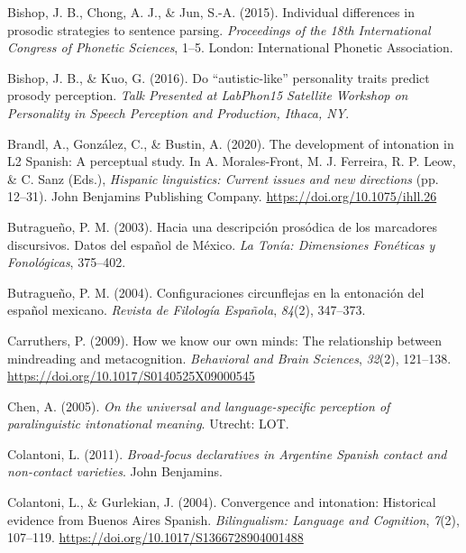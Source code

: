 \documentclass[]{article}
\newlength{\cslhangindent}
\newenvironment{CSLReferences}[2] %
 {%
  \setlength{\parindent}{0pt}
  \ifodd #1 \everypar{\setlength{\hangindent}{\cslhangindent}}\ignorespaces\fi
  \ifnum #2 > 0
  \setlength{\parskip}{#2\baselineskip}
  \fi
 }%
 {}
\begin{document}
\begin{CSLReferences}{1}{0}
\leavevmode{}%
Bishop, J. B., Chong, A. J., \& Jun, S.-A. (2015). Individual differences in prosodic strategies to sentence parsing. \emph{Proceedings of the 18th International Congress of Phonetic Sciences}, 1--5. London: International Phonetic Association.

\leavevmode{}%
Bishop, J. B., \& Kuo, G. (2016). Do {``autistic-like''} personality traits predict prosody perception. \emph{Talk Presented at LabPhon15 Satellite Workshop on Personality in Speech Perception and Production, Ithaca, NY}.

\leavevmode{}%
Brandl, A., González, C., \& Bustin, A. (2020). The development of intonation in {L}2 {S}panish: {A} perceptual study. In A. Morales-Front, M. J. Ferreira, R. P. Leow, \& C. Sanz (Eds.), \emph{Hispanic linguistics: Current issues and new directions} (pp. 12--31). John Benjamins Publishing Company. \url{https://doi.org/10.1075/ihll.26}

\leavevmode{}%
Butragueño, P. M. (2003). Hacia una descripción prosódica de los marcadores discursivos. {D}atos del español de {M}éxico. \emph{La Tonía: Dimensiones Fonéticas y Fonológicas}, 375--402.

\leavevmode{}%
Butragueño, P. M. (2004). Configuraciones circunflejas en la entonación del español mexicano. \emph{{R}evista de {F}ilología {E}spañola}, \emph{84}(2), 347--373.

\leavevmode{}%
Carruthers, P. (2009). How we know our own minds: The relationship between mindreading and metacognition. \emph{Behavioral and Brain Sciences}, \emph{32}(2), 121--138. \url{https://doi.org/10.1017/S0140525X09000545}

\leavevmode{}%
Chen, A. (2005). \emph{On the universal and language-specific perception of paralinguistic intonational meaning}. Utrecht: LOT.

\leavevmode{}%
Colantoni, L. (2011). \emph{Broad-focus declaratives in {A}rgentine {S}panish contact and non-contact varieties}. John Benjamins.

\leavevmode{}%
Colantoni, L., \& Gurlekian, J. (2004). Convergence and intonation: Historical evidence from {Buenos Aires Spanish}. \emph{Bilingualism: Language and Cognition}, \emph{7}(2), 107--119. \url{https://doi.org/10.1017/S1366728904001488}


\end{CSLReferences}
\end{document}
